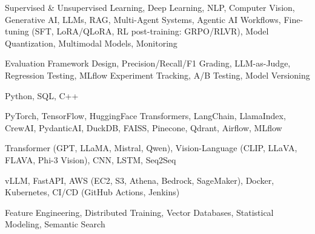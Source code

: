 \documentclass[letter,10pt]{article}
\begin{document}
 Supervised \& Unsupervised Learning, Deep Learning, NLP, Computer Vision, Generative AI, LLMs, RAG, Multi-Agent Systems, Agentic AI Workflows, Fine-tuning (SFT, LoRA/QLoRA, RL post-training: GRPO/RLVR), Model Quantization, Multimodal Models, Monitoring\par\vspace{2pt}

 Evaluation Framework Design, Precision/Recall/F1 Grading, LLM-as-Judge, Regression Testing, MLflow Experiment Tracking, A/B Testing, Model Versioning\par\vspace{2pt}

 Python, SQL, C++\par\vspace{2pt}

 PyTorch, TensorFlow, HuggingFace Transformers, LangChain, LlamaIndex, CrewAI, PydanticAI, DuckDB, FAISS, Pinecone, Qdrant, Airflow, MLflow\par\vspace{2pt}

 Transformer (GPT, LLaMA, Mistral, Qwen), Vision-Language (CLIP, LLaVA, FLAVA, Phi-3 Vision), CNN, LSTM, Seq2Seq\par\vspace{2pt}

 vLLM, FastAPI, AWS (EC2, S3, Athena, Bedrock, SageMaker), Docker, Kubernetes, CI/CD (GitHub Actions, Jenkins)\par\vspace{2pt}

 Feature Engineering, Distributed Training, Vector Databases, Statistical Modeling, Semantic Search
\end{document}
